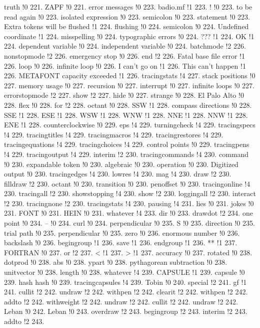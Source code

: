 truth !0 221.
ZAPF !0 221.
error messages !0 223.
badio.mf !1 223.
! !0 223.
to be read again !0 223.
isolated expression !0 223.
semicolon !0 223.
statement !0 223.
Extra tokens will be flushed !1 224.
flushing !0 224.
semicolon !0 224.
Undefined coordinate !1 224.
misspelling !0 224.
typographic errors !0 224.
??? !1 224.
OK !1 224.
dependent variable !0 224.
independent variable !0 224.
batchmode !2 226.
nonstopmode !2 226.
emergency stop !0 226.
end !2 226.
Fatal base file error !1 226.
loop !0 226.
infinite loop !0 226.
I can't go on !1 226.
This can't happen !1 226.
METAFONT capacity exceeded !1 226.
tracingstats !4 227.
stack positions !0 227.
memory usage !0 227.
recursion !0 227.
interrupt !0 227.
infinite loops !0 227.
errorstopmode !2 227.
show !2 227.
hide !0 227.
strange !0 228.
El Palo Alto !0 228.
flex !0 228.
for !2 228.
octant !0 228.
SSW !1 228.
compass directions !0 228.
SSE !1 228.
ESE !1 228.
WSW !1 228.
WNW !1 228.
NNE !1 228.
NNW !1 228.
ENE !1 228.
counterclockwise !0 229.
eps !4 229.
turningcheck !4 229.
tracingspecs !4 229.
tracingtitles !4 229.
tracingmacros !4 229.
tracingrestores !4 229.
tracingequations !4 229.
tracingchoices !4 229.
control points !0 229.
tracingpens !4 229.
tracingoutput !4 229.
interim !2 230.
tracingcommands !4 230.
command !0 230.
ex\-pand\-able token !0 230.
algebraic !0 230.
operation !0 230.
Digitized output !0 230.
tracingedges !4 230.
lowres !4 230.
mag !4 230.
draw !2 230.
filldraw !2 230.
octant !0 230.
transition !0 230.
penoffset !0 230.
tracingonline !4 230.
tracingall !2 230.
showstopping !4 230.
show !2 230.
loggingall !2 230.
interact !2 230.
tracingnone !2 230.
tracingstats !4 230.
pausing !4 231.
lies !0 231.
jokes !0 231.
FONT !0 231.
HEIN !0 231.
whatever !4 233.
dir !0 233.
drawdot !2 234.
one point !0 234.
-- !0 234.
curl !0 234.
perpendicular !0 235.
S !0 235.
direction !0 235.
trial path !0 235.
perpendicular !0 235.
zero !0 236.
enormous number !0 236.
backslash !0 236.
begingroup !1 236.
save !1 236.
endgroup !1 236.
** !1 237.
FORTRAN !0 237.
or !2 237.
< !1 237.
> !1 237.
accuracy !0 237.
rotated !0 238.
dotprod !0 238.
abs !0 238.
ypart !0 238.
pythagorean subtraction !0 238.
unitvector !0 238.
length !0 238.
whatever !4 239.
CAPSULE !1 239.
capsule !0 239.
hash hash !0 239.
tracingcapsules !4 239.
Tobin !0 240.
special !2 241.
gf !1 241.
cullit !2 242.
undraw !2 242.
withpen !2 242.
clearit !2 242.
withpen !2 242.
addto !2 242.
withweight !2 242.
undraw !2 242.
cullit !2 242.
undraw !2 242.
Leban !0 242.
Leban !0 243.
overdraw !2 243.
begingroup !2 243.
interim !2 243.
addto !2 243.
